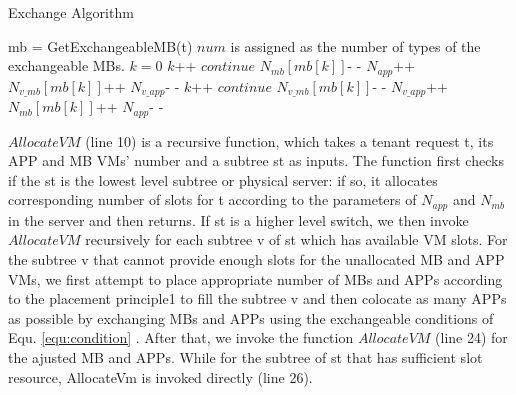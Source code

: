 \documentclass[review]{elsarticle}
\begin{document}
\begin{algorithm}
	\caption{Exchange Algorithm}
	\begin{algorithmic}[1]
	   \State mb = GetExchangeableMB(t)
	       \State $num$ is assigned as the number of types
	       \State of the exchangeable MBs.
	       \State $k = 0$
				   \State $k$++
				   \State $continue$
			   \EndIf
			   \State $N_{mb}[mb[k]]$- -
			   \State $N_{app}$++
		 	   \State $N_{v\_mb}[mb[k]]$++
			   \State $N_{v\_app}$- -
			\EndWhile
	    \Else
			   \State $k$++
			   \State $continue$
			\EndIf
			\State $N_{v\_mb}[mb[k]]$- -
			\State $N_{v\_app}$++
			\State $N_{mb}[mb[k]]$++
			\State $N_{app}$- -
		 \EndWhile
	   \EndIf
	  \EndIf
   \EndFunction    
  \end{algorithmic}
   
\end{algorithm}		

 $AllocateVM$ (line 10) is a recursive function, which takes a tenant request t, its APP and MB VMs’ number and a subtree st as inputs. The function first checks if the st is the lowest level subtree or physical server: if so, it allocates corresponding number of slots for t according to the parameters of $N_{app}$ and $N_{mb}$ in the server and then returns. If st is a higher level switch, we then invoke $AllocateVM$ recursively for each subtree v of st which has available VM slots. For the subtree v that cannot provide enough slots for the unallocated MB and APP VMs, we first attempt to place appropriate number of MBs and APPs according to the placement principle1 to fill the subtree v and then colocate as many APPs as possible by exchanging MBs and APPs using the exchangeable conditions of Equ. \ref{equ:condition} . After that, we invoke the function $AllocateVM$ (line 24) for the ajusted MB and APPs. While for the subtree of st that has sufficient slot resource, AllocateVm is invoked directly (line 26). 
\end{document}
